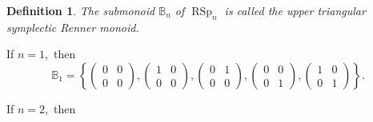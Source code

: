 \documentclass[11pt]{article}
\newtheorem{defi}[theorem]{Definition}
\DeclareMathOperator{\RSp}{RSp}
\begin{document}
\begin{defi}
The submonoid $\mathbb B_n$ of $\RSp_n$ is called the upper triangular symplectic Renner monoid. 
\end{defi}
If $n=1,$ then
$$
     \mathbb B_1 = \left\{  \begin{pmatrix}
                        0&0\\
                        0&0
                        \end{pmatrix},
                        \begin{pmatrix}
                        1&0\\
                        0&0
                        \end{pmatrix},
                        \begin{pmatrix}
                        0&1\\
                        0&0
                        \end{pmatrix},
                        \begin{pmatrix}
                        0&0\\
                        0&1
                        \end{pmatrix},
                        \begin{pmatrix}
                        1&0\\
                        0&1
                        \end{pmatrix}  
                      \right\}.
$$

If $n=2,$ then
\end{document}
